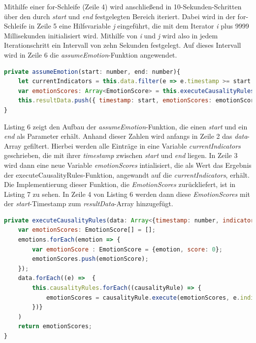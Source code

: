 Mithilfe einer for-Schleife (Zeile 4) wird anschließend in 10-Sekunden-Schritten über den durch \textit{start} und \textit{end} festgelegten Bereich iteriert. Dabei wird in der for-Schleife in Zeile 5 eine Hilfsvariable \textit{j} eingeführt, die mit dem Iterator \textit{i} plus 9999 Millisekunden initialisiert wird. Mithilfe von \textit{i} und \textit{j} wird also in jedem Iterationschritt ein Intervall von zehn Sekunden festgelegt. Auf dieses Intervall wird in Zeile 6 die \textit{assumeEmotion}-Funktion angewendet. \newline
\begin{lstlisting}[caption={assumeEmotion-Funktion der Decider-Klasse}, language=JavaScript]
private assumeEmotion(start: number, end: number){
	let currentIndicators = this.data.filter(e => e.timestamp >= start &&    e. das Ergebnis der executeCausalityRules-Funkttimestamp <= end)
	var emotionScores: Array<EmotionScore> = this.executeCausalityRules(currentIndicators);
	this.resultData.push({ timestamp: start, emotionScores: emotionScores});
}
\end{lstlisting}
Listing 6 zeigt den Aufbau der \textit{assumeEmotion}-Funktion, die einen \textit{start} und ein \textit{end} als Parameter erhält. Anhand dieser Zahlen wird anfangs in Zeile 2 das \textit{data}-Array gefiltert. Hierbei werden alle Einträge in eine Variable \textit{currentIndicators} geschrieben, die mit ihrer \textit{timestamp} zwischen \textit{start} und \textit{end} liegen. \newline
In Zeile 3 wird dann eine neue Variable \textit{emotionScores} intialisiert, die als Wert das Ergebnis der executeCausalityRules-Funktion, angewandt auf die \textit{currentIndicators}, erhält. Die Implementierung dieser Funktion, die \textit{EmotionScores} zurückliefert, ist in Listing 7 zu sehen. In Zeile 4 von Listing 6 werden dann diese \textit{EmotionScores} mit der \textit{start}-Timestamp zum \textit{resultData}-Array hinzugefügt. \newline 
\begin{lstlisting}[caption={executeCausalityRules-Funktion der Decider-Klasse}, language=JavaScript]
private executeCausalityRules(data: Array<{timestamp: number, indicatorScores: IndicatorScore[]}>){   
	var emotionScores: EmotionScore[] = [];
	emotions.forEach(emotion => {
		var emotionScore : EmotionScore = {emotion, score: 0};
		emotionScores.push(emotionScore);
	});
	data.forEach((e) =>  { 
		this.causalityRules.forEach((causalityRule) => {
			emotionScores = causalityRule.execute(emotionScores, e.indicatorScores)  ;
		})}
	)
	return emotionScores;
}
\end{lstlisting}
